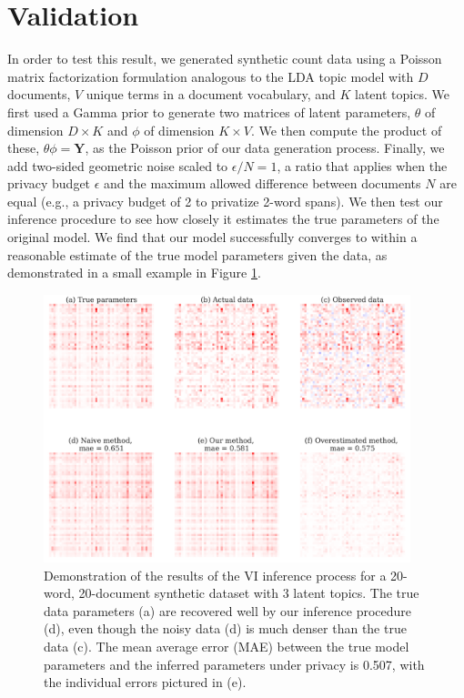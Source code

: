 \documentclass[letterpaper]{article}
\newcommand{\Yten}{\pmb{Y}}
\begin{document}
  \section{Validation}
  \label{sec:validation}
  In order to test this result, we generated synthetic count data using a
  Poisson matrix factorization formulation analogous to the LDA topic model
  \citep{blei2003latent} with $D$ documents, $V$ unique terms in a document
  vocabulary, and $K$ latent topics. We first used a Gamma prior to generate two
  matrices of latent parameters, $\theta$ of dimension $D \times K$ and $\phi$
  of dimension $K \times V$. We then compute the product of these, $\theta \phi
  = \Yten$, as the Poisson prior of our data generation process. Finally, we add
  two-sided geometric noise scaled to $\epsilon / N = 1$, a ratio that applies
  when the privacy budget $\epsilon$ and the maximum allowed difference between
  documents $N$ are equal (e.g., a privacy budget of 2 to privatize 2-word
  spans). We then test our inference procedure to see how closely it estimates
  the true parameters of the original model. We find that our model successfully
  converges to within a reasonable estimate of the true model parameters given
  the data, as demonstrated in a small example in Figure \ref{fig:test_output}.
  
  \begin{figure}[t]
      \centering
      \includegraphics[width=0.95\textwidth]{figures/test_output.pdf}
      \caption{Demonstration of the results of the VI inference process for a 20-word, 20-document synthetic dataset with 3 latent topics. The true data parameters (a) are recovered well by our inference procedure (d), even though the noisy data (d) is much denser than the true data (c). The mean average error (MAE) between the true model parameters and the inferred parameters under privacy is 0.507, with the individual errors pictured in (e).}
      \label{fig:test_output}
  \end{figure}
  
\end{document}
